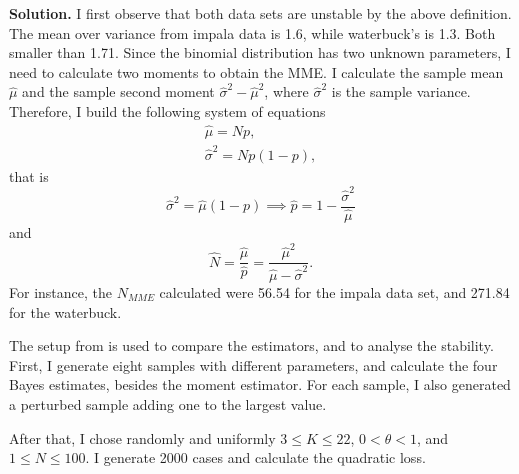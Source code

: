\vspace{2ex}

    {\bf Solution.} I first observe that both data sets are unstable by the
    above definition. The mean over variance from impala data is 1.6, while
    waterbuck's is 1.3. Both smaller than 1.71. Since the binomial
    distribution has two unknown parameters, I need to calculate two moments to
    obtain the MME. I calculate the sample mean $\hat{\mu}$ and the sample second moment $\hat{\sigma}^2 -
    \hat{\mu}^2$, where $\hat{\sigma}^2$ is the sample variance. Therefore, I build the
    following system of equations 
    \begin{gather*}
        \hat{\mu} = Np, \\
        \hat{\sigma}^2 = Np(1-p),
    \end{gather*} 
    that is 
    $$\hat{\sigma}^2 = \hat{\mu}(1 - p) \implies \hat{p} = 1 -
    \frac{\hat{\sigma}^2}{\hat{\mu}}$$
    and
    $$
    \hat{N} = \frac{\hat{\mu}}{\hat{p}} = \frac{\hat{\mu}^2}{\hat{\mu} - \hat{\sigma}^2}.
    $$
    For instance, the $N_{MME}$ calculated were 56.54 for the impala data set, and 271.84
    for the waterbuck.

    The setup from \cite[Section 3]{Carroll1985} is used to compare the
    estimators, and to analyse the stability. First, I generate eight samples
    with different parameters, and 
    calculate the four Bayes estimates, besides the moment estimator. For each
    sample, I also generated a perturbed sample adding one to the largest
    value.  
    
    
    
    
    
    After that, I chose randomly and uniformly $3 \le K \le 22$, $0 <
    \theta < 1$, and $1 \le N \le 100$. I generate 2000 cases and calculate the
    quadratic loss.   
